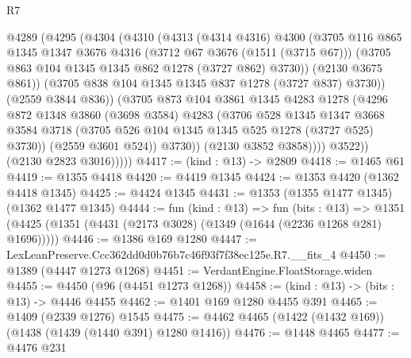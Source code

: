 \begin{lexlean}{R7}
\begin{coremodule}
                    @4289
                      (@4295
                        (@4304
                          (@4310
                            (@4313
                              (@4314 @4316)
                              @4300
                              (@3705
                                @116
                                @865
                                @1345
                                @1347
                                @3676
                                @4316
                                (@3712 @67 @3676 (@1511 (@3715 @67)))
                                (@3705 @863 @104 @1345 @1345 @862 @1278 (@3727 @862) @3730))
                              (@2130 @3675 @861))
                            (@3705 @838 @104 @1345 @1345 @837 @1278 (@3727 @837) @3730))
                          (@2559 @3844 @836))
                        (@3705
                          @873
                          @104
                          @3861
                          @1345
                          @4283
                          @1278
                          (@4296
                            @872
                            @1348
                            @3860
                            (@3698 @3584)
                            @4283
                            (@3706
                              @528
                              @1345
                              @1347
                              @3668
                              @3584
                              @3718
                              (@3705 @526 @104 @1345 @1345 @525 @1278 (@3727 @525) @3730))
                            (@2559 @3601 @524))
                          @3730))
                      (@2130 @3852 @3858))))
                @3522))
            (@2130 @2823 @3016)))))
@4417 := (kind : @13) -> @2809
@4418 := @1465 @61
@4419 := @1355 @4418
@4420 := @4419 @1345
@4424 := @1353 @4420 (@1362 @4418 @1345)
@4425 := @4424 @1345
@4431 := @1353 (@1355 @1477 @1345) (@1362 @1477 @1345)
@4444 := fun (kind : @13) =>
  fun (bits : @13) =>
  @1351 (@4425 (@1351 (@4431 (@2173 @3028) (@1349 (@1644 (@2236 @1268 @281) @1696)))))
@4446 := @1386 @169 @1280
@4447 := LexLeanPreserve.Ccc362dd0d0b76b7c46f93f7f38ec125e.R7.__fits_4
@4450 := @1389 (@4447 @1273 @1268)
@4451 := VerdantEngine.FloatStorage.widen
@4455 := @4450 (@96 (@4451 @1273 @1268))
@4458 := (kind : @13) -> (bits : @13) -> @4446 @4455
@4462 := @1401 @169 @1280 @4455 @391
@4465 := @1409 (@2339 @1276) @1545
@4475 := @4462 @4465 (@1422 (@1432 @169)) (@1438 (@1439 (@1440 @391) @1280 @1416))
@4476 := @1448 @4465
@4477 := @4476 @231

\end{coremodule}
\end{lexlean}
